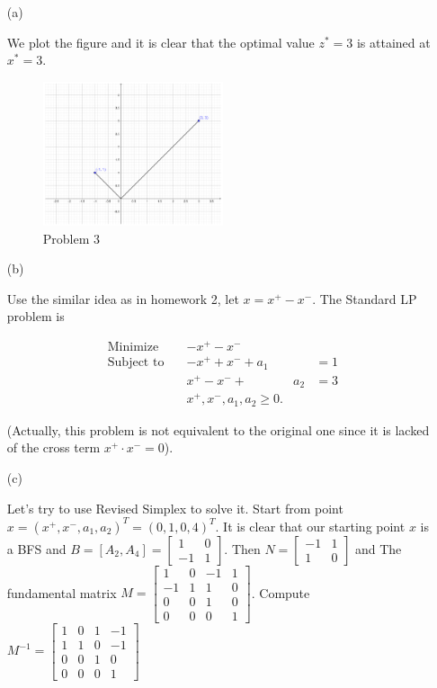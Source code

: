 \documentclass[12pt]{article}
\begin{document}
\begin{enumerate}
\item[(a)]

We plot the figure and it is clear that the optimal value $z^* = 3$ is attained at $x^* = 3$.

\begin{figure}[htbp]
  \caption{Problem 3}
  \centering
    \includegraphics[width=0.5\textwidth]{p3.pdf}
\end{figure}

\FloatBarrier

\item[(b)]

Use the similar idea as in homework 2, let $x = x^+ - x^-$. The Standard LP problem is

$$
\begin{aligned}
\text{Minimize} \quad & - x^+ - x^- \\
\text{Subject to} \quad & - x^+ + x^- +  a_1 &  & = 1 \\
& x^+ - x^- +  & a_2 &= 3\\
& x^+ , x^-, a_1, a_2 \geqslant 0. 
\end{aligned}
$$

(Actually, this problem is not equivalent to the original one since it is lacked of the cross term $x^+\cdot x^- = 0$).

\item [(c)]

Let's try to use Revised Simplex to solve it. Start from point $x = (x^+, x^-, a_1, a_2)^T = (0, 1, 0, 4)^T$. It is clear that our starting point $x$ is a BFS and $B = [A_2, A_4] = \begin{bmatrix}
1 & 0 \\
-1 & 1
\end{bmatrix}$. Then $N = \begin{bmatrix}
-1 & 1 \\
1 & 0
\end{bmatrix}$ and  The fundamental matrix $M = \begin{bmatrix}
1 & 0 & -1 & 1 \\
-1 & 1 & 1 & 0 \\
0 & 0 & 1 & 0 \\
0 & 0 & 0 & 1
\end{bmatrix}$. Compute $M^{-1} = \begin{bmatrix}
1 & 0 & 1 & -1 \\
1 & 1 & 0 & -1 \\
0 & 0 & 1 & 0 \\
0 & 0 & 0 & 1
\end{bmatrix}$


\end{enumerate}
\end{document}

